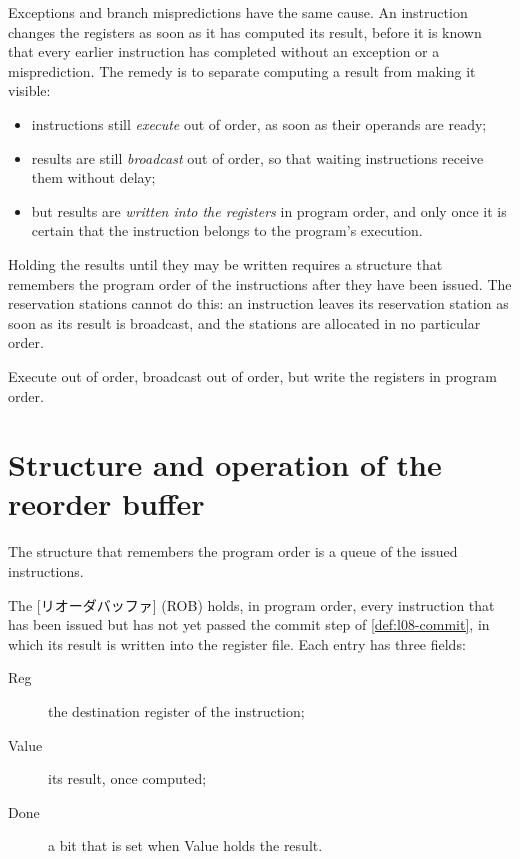 \documentclass[../main.tex]{subfiles}
\begin{document}
Exceptions and branch mispredictions have the same cause.  An
instruction changes the registers as
soon as it has computed its result, before it is known that every earlier
instruction has completed without an exception or a
misprediction.  The
remedy is to separate computing a result from making it visible:
\begin{itemize}
  \item instructions still \emph{execute} out of order, as soon as their
    operands are ready;
  \item results are still \emph{broadcast} out of order, so that waiting
    instructions receive them without delay;
  \item but results are \emph{written into the registers} in program order,
    and only once it is certain that the instruction belongs to the program's
    execution.
\end{itemize}
Holding the results until they may be written requires a structure that
remembers the program order of the instructions after they have been issued.
The reservation stations cannot do this: an instruction leaves its
reservation station as soon as its result is broadcast, and the stations are
allocated in no particular order.

\begin{keypoint}
  Execute out of order, broadcast out of order, but write the registers in
  program order.
\end{keypoint}

\section{Structure and operation of the reorder buffer}
\label{sec:l08-rob}

The structure that remembers the program order is a queue of the issued
instructions.

\begin{definition}
  \label{def:l08-rob}
  The [リオーダバッファ]
  (ROB) holds, in program order, every instruction that has been issued but
  has not yet passed the commit step of \cref{def:l08-commit}, in which its
  result is written into the register file.  Each entry has three fields:
  \begin{description}
    \item[Reg] the destination register of the instruction;
    \item[Value] its result, once computed;
    \item[Done] a bit that is set when Value holds the result.
  \end{description}
\end{definition}
\end{document}
